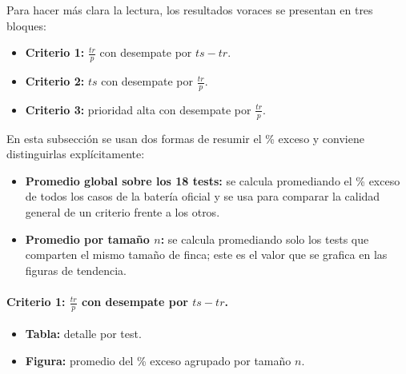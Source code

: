 \documentclass[12pt,a4paper]{article}
\begin{document}
Para hacer m\'as clara la lectura, los resultados voraces se presentan en tres bloques:
\begin{itemize}
  \item \textbf{Criterio 1:} \(\frac{tr}{p}\) con desempate por \(ts-tr\).
  \item \textbf{Criterio 2:} \(ts\) con desempate por \(\frac{tr}{p}\).
  \item \textbf{Criterio 3:} prioridad alta con desempate por \(\frac{tr}{p}\).
\end{itemize}

En esta subsecci\'on se usan dos formas de resumir el \% exceso y conviene distinguirlas expl\'icitamente:
\begin{itemize}
  \item \textbf{Promedio global sobre los 18 tests:} se calcula promediando el \% exceso de todos los casos de la bater\'ia oficial y se usa para comparar la calidad general de un criterio frente a los otros.
  \item \textbf{Promedio por tama\~no \(n\):} se calcula promediando solo los tests que comparten el mismo tama\~no de finca; este es el valor que se grafica en las figuras de tendencia.
\end{itemize}

\paragraph{Criterio 1: \(\frac{tr}{p}\) con desempate por \(ts-tr\).}
\begin{itemize}
  \item \textbf{Tabla:} detalle por test.
  \item \textbf{Figura:} promedio del \% exceso agrupado por tama\~no \(n\).
\end{itemize}

\medskip
\end{document}
